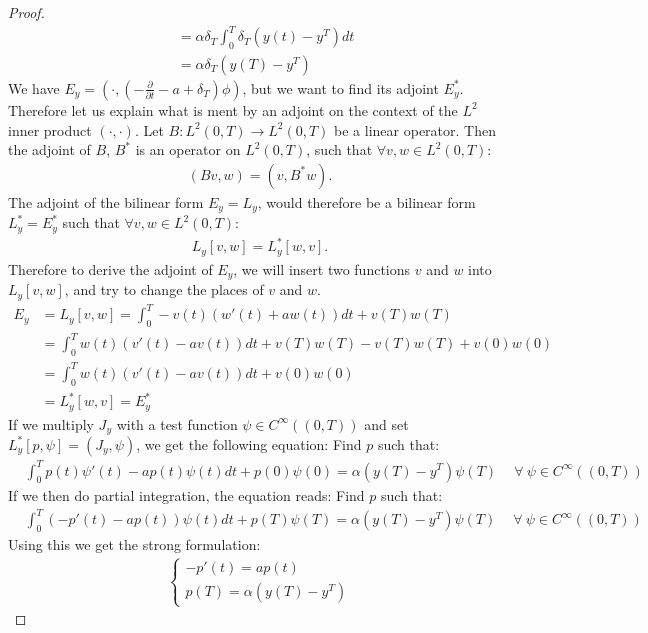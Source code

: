 \begin{proof}
\begin{align*}
&= \alpha\delta_T\int_0^T \delta_T(y(t)-y^T)dt \\
&= \alpha\delta_T(y(T)-y^T)
\end{align*}
We have $E_y=(\cdot,(-\frac{\partial}{\partial t} - a + \delta_T)\phi)$, but we want to find its adjoint $E_y^*$. Therefore let us explain what is ment by an adjoint on the context of the $L^2$ inner product $(\cdot,\cdot)$. Let $B:L^2(0,T)\rightarrow L^2(0,T)$ be a linear operator. Then the adjoint of $B$, $B^*$ is an operator on $ L^2(0,T)$, such that $\forall v,w\in L^2(0,T)$:
\begin{align*}
(Bv,w)=(v,B^*w).
\end{align*}
The adjoint of the bilinear form $E_y=L_y$, would therefore be a bilinear form $L_y^*=E_y^*$ such that $\forall v,w\in L^2(0,T)$:
\begin{align*}
L_y[v,w]=L_y^*[w,v].
\end{align*}
Therefore to derive the adjoint of $E_y$, we will insert two functions $v$ and $w$ into $L_y[v,w]$, and try to change the places of $v$ and $w$.
\begin{align*}
E_y&=L_y[v,w]=\int_0^T-v(t)(w'(t)+aw(t))dt + v(T)w(T) \\
&=\int_0^Tw(t)(v'(t)-av(t))dt + v(T)w(T)-v(T)w(T) +v(0)w(0) \\
&=\int_0^Tw(t)(v'(t)-a v(t))dt+v(0)w(0) \\
&=L_y^*[w,v]=E_y^*
\end{align*}
If we multiply $J_y$ with a test function $\psi\in C^{\infty}((0,T))$ and set $L_y^*[p,\psi]=(J_y,\psi)$, we get the following equation: Find $p$ such that:
\begin{align*}
&\int_0^Tp(t)\psi'(t)-a p(t)\psi(t)dt + p(0)\psi(0)= \alpha(y(T)-y^T)\psi(T)\ \quad\forall \ \psi \in C^{\infty}((0,T))
\end{align*}
If we then do partial integration, the equation reads: Find $p$ such that:
\begin{align*}
&\int_0^T(-p'(t)-ap(t))\psi(t)dt +p(T)\psi(T)= \alpha(y(T)-y^T)\psi(T)\ \quad\forall \ \psi \in C^{\infty}((0,T))
\end{align*}
Using this we get the strong formulation:
\begin{align*}
   \left\{
     \begin{array}{lr}
       -p'(t) = ap(t) \\
       p(T) = \alpha( y(T)-y^T)
     \end{array}
   \right.
\end{align*}
\end{proof}
